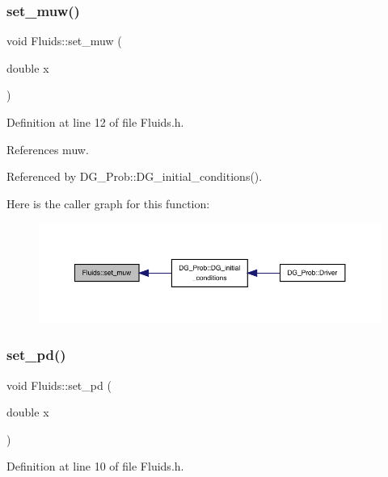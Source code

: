 \subsubsection{\texorpdfstring{set\+\_\+muw()}{set\_muw()}}
{\footnotesize\ttfamily void Fluids\+::set\+\_\+muw (\begin{DoxyParamCaption}\item[{double}]{x }\end{DoxyParamCaption})\hspace{0.3cm}{\ttfamily [inline]}}



Definition at line 12 of file Fluids.\+h.



References muw.



Referenced by D\+G\+\_\+\+Prob\+::\+D\+G\+\_\+initial\+\_\+conditions().

Here is the caller graph for this function\+:
\nopagebreak
\begin{figure}[H]
\begin{center}
\leavevmode
\includegraphics[width=350pt]{classFluids_a55bdef7f5229ab62d2616d4617d5898c_icgraph}
\end{center}
\end{figure}
\mbox{\label{classFluids_ac0bfd221bb7f40b21eeb4c20f4e68017}} 
\subsubsection{\texorpdfstring{set\+\_\+pd()}{set\_pd()}}
{\footnotesize\ttfamily void Fluids\+::set\+\_\+pd (\begin{DoxyParamCaption}\item[{double}]{x }\end{DoxyParamCaption})\hspace{0.3cm}{\ttfamily [inline]}}



Definition at line 10 of file Fluids.\+h.



